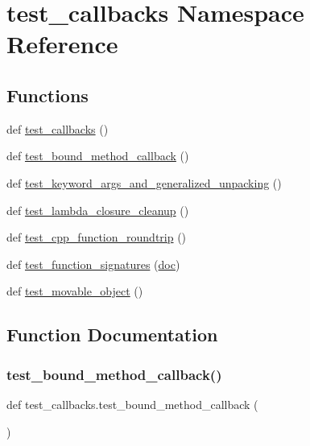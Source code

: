 \hypertarget{namespacetest__callbacks}{}\section{test\+\_\+callbacks Namespace Reference}
\label{namespacetest__callbacks}
\subsection*{Functions}
\begin{DoxyCompactItemize}
\item 
def \mbox{\hyperlink{namespacetest__callbacks_aae473d03c5d0afa46ec840f897be8b8d}{test\+\_\+callbacks}} ()
\item 
def \mbox{\hyperlink{namespacetest__callbacks_a84f52c4913040e6576aa56e74705b348}{test\+\_\+bound\+\_\+method\+\_\+callback}} ()
\item 
def \mbox{\hyperlink{namespacetest__callbacks_afb31761ab7d443f395659b1009da40c7}{test\+\_\+keyword\+\_\+args\+\_\+and\+\_\+generalized\+\_\+unpacking}} ()
\item 
def \mbox{\hyperlink{namespacetest__callbacks_aed1306e4d3b8dbf8a81ad88b1fb7da53}{test\+\_\+lambda\+\_\+closure\+\_\+cleanup}} ()
\item 
def \mbox{\hyperlink{namespacetest__callbacks_a8986001a0e43924db55c88c589c89a3f}{test\+\_\+cpp\+\_\+function\+\_\+roundtrip}} ()
\item 
def \mbox{\hyperlink{namespacetest__callbacks_afbaf14de2b05df41c6e7b686c68e2519}{test\+\_\+function\+\_\+signatures}} (\mbox{\hyperlink{structdoc}{doc}})
\item 
def \mbox{\hyperlink{namespacetest__callbacks_af0eecfa6523f84e0ac038aa6ee3e520c}{test\+\_\+movable\+\_\+object}} ()
\end{DoxyCompactItemize}


\subsection{Function Documentation}
\mbox{\label{namespacetest__callbacks_a84f52c4913040e6576aa56e74705b348}} 
\subsubsection{\texorpdfstring{test\_bound\_method\_callback()}{test\_bound\_method\_callback()}}
{\footnotesize\ttfamily def test\+\_\+callbacks.\+test\+\_\+bound\+\_\+method\+\_\+callback (\begin{DoxyParamCaption}{ }\end{DoxyParamCaption})}

